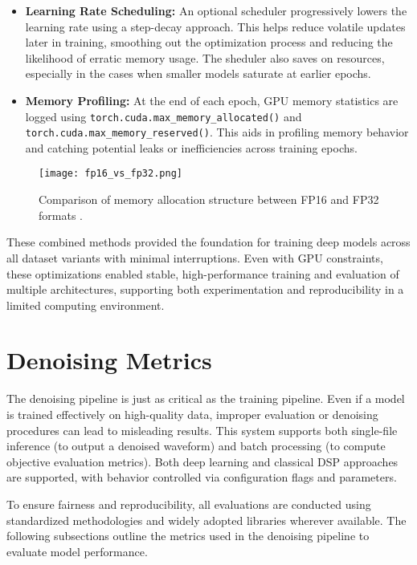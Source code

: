 \begin{itemize}
    \item \textbf{Learning Rate Scheduling:} An optional scheduler progressively lowers the learning rate using a step-decay approach. This helps reduce volatile updates later in training, smoothing out the optimization process and reducing the likelihood of erratic memory usage. The sheduler also saves on resources, especially in the cases when smaller models saturate at earlier epochs.

    \item \textbf{Memory Profiling:} At the end of each epoch, GPU memory statistics are logged using \texttt{torch.cuda.max\_memory\_allocated()} and \texttt{torch.cuda.max\_memory\_reserved()}. This aids in profiling memory behavior and catching potential leaks or inefficiencies across training epochs. 
\end{itemize}

\begin{figure}[H]
    \centering
    \texttt{[image: fp16\_vs\_fp32.png]}
    \caption{Comparison of memory allocation structure between FP16 and FP32 formats \cite{mindspore_mixed_precision}.}
    \label{fig:fp16_vs_fp32}
\end{figure}

These combined methods provided the foundation for training deep models across all dataset variants with minimal interruptions. Even with GPU constraints, these optimizations enabled stable, high-performance training and evaluation of multiple architectures, supporting both experimentation and reproducibility in a limited computing environment.

\section{Denoising Metrics}
\label{sec:denoising_metrics}

The denoising pipeline is just as critical as the training pipeline. Even if a model is trained effectively on high-quality data, improper evaluation or denoising procedures can lead to misleading results. This system supports both single-file inference (to output a denoised waveform) and batch processing (to compute objective evaluation metrics). Both deep learning and classical DSP approaches are supported, with behavior controlled via configuration flags and parameters.

To ensure fairness and reproducibility, all evaluations are conducted using standardized methodologies and widely adopted libraries wherever available. The following subsections outline the metrics used in the denoising pipeline to evaluate model performance.

